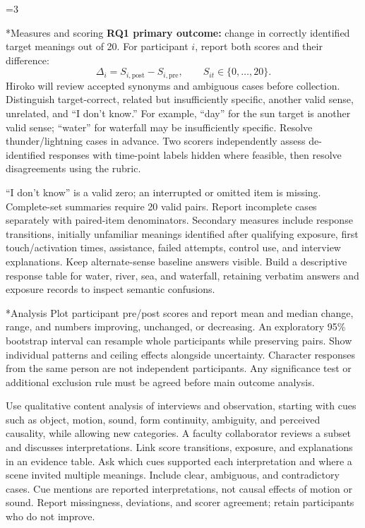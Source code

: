 \documentclass[10pt,letterpaper]{article}
\makeatletter
\renewcommand\section{\@startsection{section}{1}{0pt}{8pt}{4pt}{\normalfont\large\bfseries}}
\newcommand{\nextpage}[1]{\clearpage\ifnum\value{page}=#1\relax\else\PackageError{proposal-length}{A planned page overflowed}{Shorten the preceding page.}\fi}
\makeatother
\begin{document}
\nextpage{3}
\section*{Measures and scoring}
\textbf{RQ1 primary outcome:} change in correctly identified target meanings out of 20. For participant $i$, report both scores and their difference:
\[
\Delta_i=S_{i,\mathrm{post}}-S_{i,\mathrm{pre}},\qquad S_{it}\in\{0,\ldots,20\}.
\]
Hiroko will review accepted synonyms and ambiguous cases before collection. Distinguish target-correct, related but insufficiently specific, another valid sense, unrelated, and ``I don't know.'' For example, ``day'' for the sun target is another valid sense; ``water'' for waterfall may be insufficiently specific. Resolve thunder/lightning cases in advance. Two scorers independently assess de-identified responses with time-point labels hidden where feasible, then resolve disagreements using the rubric.

``I don't know'' is a valid zero; an interrupted or omitted item is missing. Complete-set summaries require 20 valid pairs. Report incomplete cases separately with paired-item denominators. Secondary measures include response transitions, initially unfamiliar meanings identified after qualifying exposure, first touch/activation times, assistance, failed attempts, control use, and interview explanations. Keep alternate-sense baseline answers visible. Build a descriptive response table for water, river, sea, and waterfall, retaining verbatim answers and exposure records to inspect semantic confusions.

\section*{Analysis}
Plot participant pre/post scores and report mean and median change, range, and numbers improving, unchanged, or decreasing. An exploratory 95\% bootstrap interval can resample whole participants while preserving pairs. Show individual patterns and ceiling effects alongside uncertainty. Character responses from the same person are not independent participants. Any significance test or additional exclusion rule must be agreed before main outcome analysis.

Use qualitative content analysis of interviews and observation, starting with cues such as object, motion, sound, form continuity, ambiguity, and perceived causality, while allowing new categories. A faculty collaborator reviews a subset and discusses interpretations. Link score transitions, exposure, and explanations in an evidence table. Ask which cues supported each interpretation and where a scene invited multiple meanings. Include clear, ambiguous, and contradictory cases. Cue mentions are reported interpretations, not causal effects of motion or sound. Report missingness, deviations, and scorer agreement; retain participants who do not improve.
\end{document}

